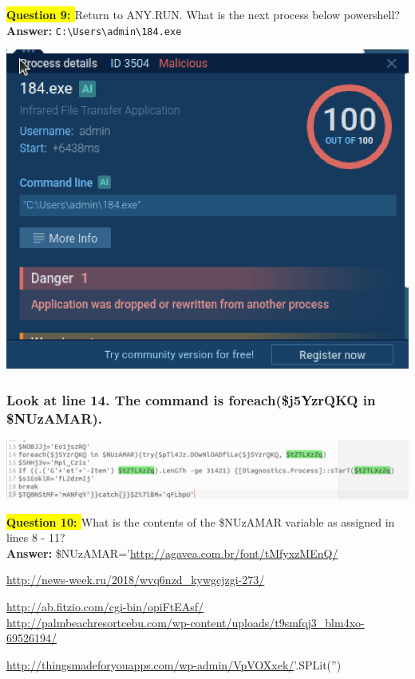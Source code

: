 \documentclass{article}
\begin{document}
\vspace{1\baselineskip}

\textbf{\colorbox{yellow}{Question 9: }} Return to ANY.RUN. What is the next process below powershell? \\
\textbf{Answer: } \texttt{C:\textbackslash Users\textbackslash admin\textbackslash 184.exe}

\vspace{1\baselineskip}

\includegraphics[width=1\textwidth]{18.png}

\vspace{1\baselineskip}

\subsubsection*{Look at line 14. The command is foreach(\$j5YzrQKQ in \$NUzAMAR).}

\vspace{1\baselineskip}

\includegraphics[width=1\textwidth]{19.png}

\vspace{1\baselineskip}

\textbf{\colorbox{yellow}{Question 10: }} What is the contents of the \$NUzAMAR variable as assigned in lines 8 - 11? \\
\textbf{Answer: } 
\$NUzAMAR='\url{http://agavea.com.br/font/tMfyxzMEnQ/} 

\url{http://news-week.ru/2018/wvq6nzd_kywgcjzgi-273/} 

\url{http://ab.fitzio.com/cgi-bin/opiFtEAsf/} \\

\url{http://palmbeachresortcebu.com/wp-content/uploads/t9smfqj3_blm4xo-69526194/}

\url{http://thingsmadeforyouapps.com/wp-admin/VpVOXxek/}'.SPLit('') \newline
\end{document}
